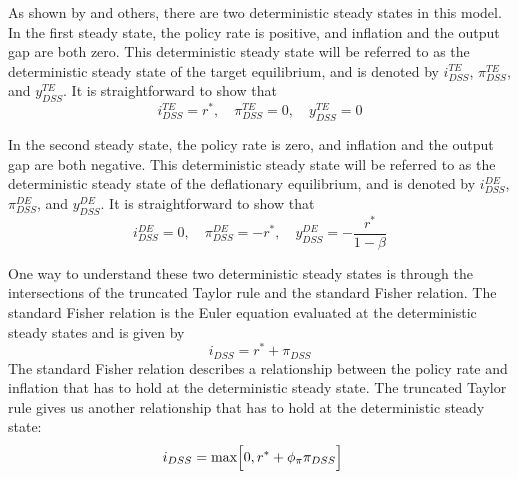 \documentclass[11pt]{article}
\begin{document}
	As shown by \citet{BenhabibSchmittGroheUribe2001} and others, there are two deterministic steady states in this model. In the first steady state, the policy rate is positive, and inflation and the output gap are both zero. This deterministic steady state will be referred to as the deterministic steady state of the target equilibrium, and is denoted by $i_{DSS}^{TE}$, $\pi_{DSS}^{TE}$, and $y_{DSS}^{TE}$. It is straightforward to show that
	\begin{equation}
	i_{DSS}^{TE} = r^*,\hspace{1em}\pi_{DSS}^{TE} = 0,\hspace{1em} y_{DSS}^{TE} = 0 
	\end{equation}
	
	In the second steady state, the policy rate is zero, and inflation and the output gap are both negative. This deterministic steady state will be referred to as the deterministic steady state of the deflationary equilibrium, and is denoted by $i_{DSS}^{DE}$, $\pi_{DSS}^{DE}$, and $y_{DSS}^{DE}$. It is straightforward to show that
	\begin{equation}
	i_{DSS}^{DE} = 0,\hspace{1em}\pi_{DSS}^{DE}= -r^*,\hspace{1em}y_{DSS}^{DE} = -\frac{r^*}{1-\beta}
	\end{equation}
	
	One way to understand these two deterministic steady states is through the intersections of the truncated Taylor rule and the standard Fisher relation. The standard Fisher relation is the Euler equation evaluated at the deterministic steady states and is given by
	\begin{equation}
	i_{DSS} =  r^* + \pi_{DSS}\label{eq:FR}
	\end{equation}
	The standard Fisher relation describes a relationship between the policy rate and inflation that has to hold at the deterministic steady state. The truncated Taylor rule gives us another relationship that has to hold at the deterministic steady state:
	\begin{align}
	& i_{DSS} =  \text{max}\Bigl[0,r^* + \phi_{\pi}\pi_{DSS}\Bigr]\label{eq:TTR}
	\end{align}
	
\end{document}
